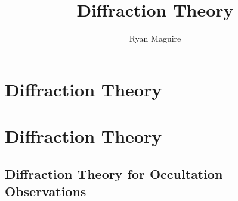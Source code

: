 \documentclass[crop=false,class=book,oneside]{standalone}
\begin{document}
    \ifx\ifplanetdiff\undefined
        \newif\iffunct
        \title{Diffraction Theory}
        \author{Ryan Maguire}
        \date{\vspace{-5ex}}
        \maketitle
        \tableofcontents
        \clearpage
        \setcounter{chapter}{3}
        \chapter{Diffraction Theory}
    \else
        \chapter{Diffraction Theory}
    \fi
    \section{Diffraction Theory for Occultation Observations}
\end{document}
